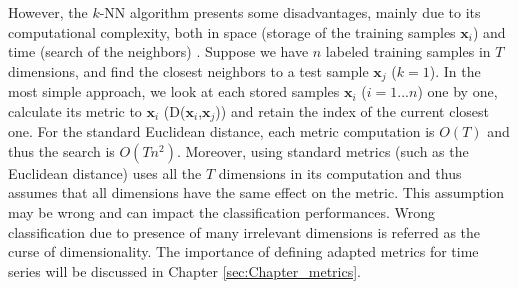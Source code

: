 However, the $k$-NN algorithm presents some disadvantages, mainly due to its computational complexity, both in space (storage of the training samples $\textbf{x}_i$) and time (search of the neighbors) \cite{Duda1973}. Suppose we have $n$ labeled training samples in $T$ dimensions, and find the closest neighbors to a test sample $\textbf{x}_j$ ($k = 1$). In the most simple approach, we look at each stored samples $\textbf{x}_i$ ($i=1...n$) one by one, calculate its metric to $\textbf{x}_i$ (D($\textbf{x}_i$,$\textbf{x}_j$)) and retain the index of the current closest one. For the standard Euclidean distance, each metric computation is $O(T)$ and thus the search is $O(Tn^2)$. Moreover, using standard metrics (such as the Euclidean distance) uses all the $T$ dimensions in its computation and thus assumes that all dimensions have the same effect on the metric. This assumption may be wrong and can impact the classification performances. Wrong classification due to presence of many irrelevant dimensions is referred as the curse of dimensionality. The importance of defining adapted metrics for time series will be discussed in Chapter \ref{sec:Chapter_metrics}.



